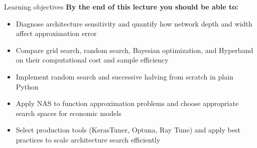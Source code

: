 \documentclass[aspectratio=169,11pt]{beamer}
\begin{document}
\begin{frame}{Learning objectives}
\textbf{By the end of this lecture you should be able to:}
\begin{itemize}
  \item Diagnose architecture sensitivity and quantify how network depth and width affect approximation error
  \item Compare grid search, random search, Bayesian optimization, and Hyperband on their computational cost and sample efficiency
  \item Implement random search and successive halving from scratch in plain Python
  \item Apply NAS to function approximation problems and choose appropriate search spaces for economic models
  \item Select production tools (KerasTuner, Optuna, Ray Tune) and apply best practices to scale architecture search efficiently
\end{itemize}
\end{frame}


\end{document}
